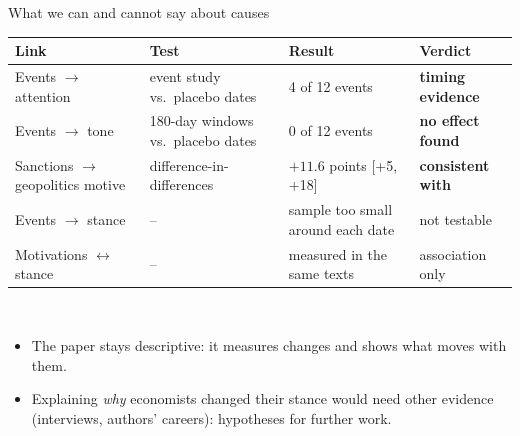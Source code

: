 \documentclass[aspectratio=169,10pt]{beamer}
\begin{document}
\begin{frame}{What we can and cannot say about causes}
\footnotesize
\begin{tabular}{@{}p{}p{}p{}p{}@{}}\toprule
\textbf{Link} & \textbf{Test} & \textbf{Result} & \textbf{Verdict}\\\midrule
Events $\to$ attention & event study vs.\ placebo dates & 4 of 12 events & \textcolor{c6}{\textbf{timing evidence}}\\
Events $\to$ tone & 180-day windows vs.\ placebo dates & 0 of 12 events & \textcolor{c2}{\textbf{no effect found}}\\
Sanctions $\to$ geopolitics motive & difference-in-differences & $+11.6$ points [+5, +18] & \textcolor{c3}{\textbf{consistent with}}\\
Events $\to$ stance & -- & sample too small around each date & not testable\\
Motivations $\leftrightarrow$ stance & -- & measured in the same texts & association only\\
\bottomrule\end{tabular}\\[8pt]
\small
\begin{itemize}\setlength\itemsep{2pt}
\item The paper stays \alert{descriptive}: it measures changes and shows what moves with them.
\item Explaining \emph{why} economists changed their stance would need other evidence (interviews, authors' careers): hypotheses for further work.
\end{itemize}
\end{frame}
\end{document}
